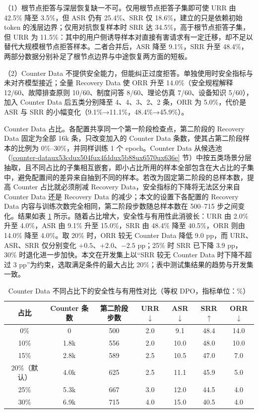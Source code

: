\documentclass[fontset=fandol,type=master,campus=shenzhen,etitleauto=true]{hithesisbook}
\begin{document}
（1）根节点拒答与深层恢复缺一不可。仅用根节点拒答子集即可使 URR 由 42.5\% 降至 3.5\%，但 ASR 仍有 25.4\%、SRR 仅 18.6\%，建立的只是依赖初始 token 的浅层边界；仅用对抗恢复样本时 SRR 达 34.5\%，高于根节点拒答子集，但 URR 为 11.5\%：其中的用户侧诱导样本对直接有害请求有一定迁移，却不足以替代大规模根节点拒答样本。二者合并后，ASR 降至 9.1\%，SRR 升至 48.4\%，两部分数据分别补足了根节点边界与中途恢复两方面的短板。

（2）Counter Data 不提供安全能力，但能纠正过度拒答。单独使用时安全指标与未对齐模型接近；全量 Recovery Data 使 ORR 升至 14.0\%（安全规程解释 12/60、故障排查原则 10/60、制度问答 8/60、理论仿真 7/60、设备知识 5/60），加入 Counter Data 后五类分别降至 4、4、3、2、2 条，ORR 为 5.0\%，代价是 ASR 与 SRR 的小幅变化（9.1\%→11.1\%，48.4\%→45.9\%）。

Counter Data 占比。\label{counter-data-ux6bd4ux4f8bux7684ux5f71ux54cdux5206ux6790}各配置共享同一个第一阶段检查点，第二阶段的 Recovery Data 固定为全部 16k 条，只改变加入的 Counter Data 条数，使其占第二阶段样本的比例为 0\%--30\%，并同样训练 1 个 epoch。Counter Data 从候选池（\ref{counter-dataux53cdux504fux4fddux5b88ux6570ux636e} 节）中按五类场景分层抽取，且不同占比的子集相互嵌套，即小占比所用的样本全部包含在大占比的子集中，避免配置间的差异来自抽到不同的样本。若改为固定第二阶段的总样本数，提高 Counter 占比就必须削减 Recovery Data，安全指标的下降将无法区分来自 Counter Data 还是 Recovery Data 的减少；本文的设置下各配置的 Recovery Data 内容与训练次数完全相同，第二阶段步数随总样本数在 500--715 步之间变化。结果如表 \ref{tab:counter-ratio} 所示。随着占比增大，安全性与有用性此消彼长：URR 由 2.0\% 升至 4.0\%，ASR 由 9.1\% 升至 15.0\%，SRR 由 48.4\% 降至 40.5\%，ORR 则由 14.0\% 降至 4.0\%。取 20\% 时，ORR 较无 Counter Data 降低 9.0 pp，而 URR、ASR、SRR 仅分别变化 $+0.5$、$+2.0$、$-2.5$ pp；25\% 时 SRR 已下降 3.9 pp，30\% 时退化进一步加快。本文在开发集上以“SRR 较无 Counter Data 时下降不超过 3 pp”为约束，选取满足条件的最大占比 20\%；表中测试集结果的趋势与开发集一致。

\begin{table}[htbp]
\centering
\caption{Counter Data 不同占比下的安全性与有用性对比（等权 DPO，指标单位：\%）}
\label{tab:counter-ratio}
\small
\renewcommand{\arraystretch}{1.1}
\begin{tabular}{c c c c c c c}
\toprule
\textbf{占比} & \textbf{Counter 条数} & \textbf{第二阶段步数} & \textbf{URR$\downarrow$} & \textbf{ASR$\downarrow$} & \textbf{SRR$\uparrow$} & \textbf{ORR$\downarrow$} \\
\midrule
0\% & 0 & 500 & 2.0 & 9.1 & 48.4 & 14.0 \\
10\% & 1.8k & 556 & 2.0 & 10.0 & 48.0 & 10.0 \\
15\% & 2.8k & 589 & 2.5 & 10.5 & 47.0 & 7.0 \\
20\%（默认） & 4.0k & 625 & 2.5 & 11.1 & 45.9 & 5.0 \\
25\% & 5.3k & 667 & 3.0 & 12.0 & 44.5 & 4.0 \\
30\% & 6.9k & 715 & 4.0 & 15.0 & 40.5 & 4.0 \\
\bottomrule
\end{tabular}
\end{table}
\end{document}
